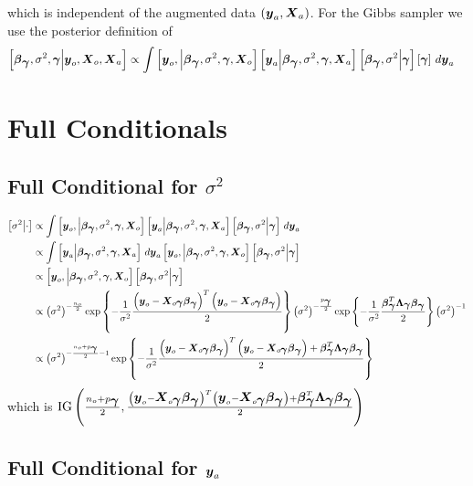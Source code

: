 \documentclass{article}
\def\bm#1{\mbox{\boldmath $#1$}}
\begin{document}
%
which is independent of the augmented data $\left( \bm{y}_a, \bm{X}_a \right)$. For the Gibbs sampler we use the posterior definition of
\begin{align*}
\left[ \bm{\beta}_{\bm{\gamma}}, \sigma^2, \bm{\gamma} \middle| \bm{y}_o, \bm{X}_o, \bm{X}_a \right] & \propto \int \left[ \bm{y}_o, \middle| \bm{\beta}_{\bm{\gamma}}, \sigma^2, \bm{\gamma}, \bm{X}_o \right] \left[ \bm{y}_a \middle| \bm{\beta}_{\bm{\gamma}}, \sigma^2, \bm{\gamma}, \bm{X}_a \right] \left[ \bm{\beta}_{\bm{\gamma}}, \sigma^2 \middle| \bm{\gamma} \right] \left[ \bm{\gamma} \right] \, d \bm{y}_a
\end{align*}
\section{Full Conditionals}
\subsection{Full Conditional for $\sigma^2$}
%
\begin{align*}
%
\left[ \sigma^2 \middle| \cdot \right] & \propto \int \left[ \bm{y}_o, \middle| \bm{\beta}_{\bm{\gamma}}, \sigma^2, \bm{\gamma}, \bm{X}_o \right] \left[ \bm{y}_a \middle| \bm{\beta}_{\bm{\gamma}}, \sigma^2, \bm{\gamma}, \bm{X}_a \right] \left[ \bm{\beta}_{\bm{\gamma}}, \sigma^2 \middle| \bm{\gamma} \right] \, d \bm{y}_a\\
%
 & \propto \int \left[ \bm{y}_a \middle| \bm{\beta}_{\bm{\gamma}}, \sigma^2, \bm{\gamma}, \bm{X}_a \right] \, d \bm{y}_a \left[ \bm{y}_o, \middle| \bm{\beta}_{\bm{\gamma}}, \sigma^2, \bm{\gamma}, \bm{X}_o \right] \left[ \bm{\beta}_{\bm{\gamma}}, \sigma^2 \middle| \bm{\gamma} \right] \\
%
 & \propto \left[ \bm{y}_o, \middle| \bm{\beta}_{\bm{\gamma}}, \sigma^2, \bm{\gamma}, \bm{X}_o \right] \left[ \bm{\beta}_{\bm{\gamma}}, \sigma^2 \middle| \bm{\gamma} \right] \\
%
 & \propto \left( \sigma^2 \right)^{ - \frac{n_o} {2}} \exp{\left\{ - \frac{1} {\sigma^2} \frac{ \left( \bm{y}_o - \bm{X}_{o \bm{\gamma}} \bm{\beta}_{\bm{\gamma}} \right)^T \left( \bm{y}_o - \bm{X}_{o \bm{\gamma}} \bm{\beta}_{\bm{\gamma}} \right) } {2} \right\} } \left( \sigma^2 \right)^{ - \frac{p_{\bm{\gamma}}} {2}} \exp{ \left\{ - \frac{1} {\sigma^2} \frac{\bm{\beta}_{\bm{\gamma}}^T \bm{\Lambda}_{\bm{\gamma}} \bm{\beta}_{\bm{\gamma}}} {2} \right\} } \left( \sigma^2 \right)^{ - 1}\\
%
 & \propto \left( \sigma^2 \right)^{ - \frac{n_o + p_{\bm{\gamma}}} {2} - 1} \exp{\left\{ - \frac{1} {\sigma^2} \frac{ \left( \bm{y}_o - \bm{X}_{o \bm{\gamma}} \bm{\beta}_{\bm{\gamma}} \right)^T \left( \bm{y}_o - \bm{X}_{o \bm{\gamma}} \bm{\beta}_{\bm{\gamma}} \right) + \bm{\beta}_{\bm{\gamma}}^T \bm{\Lambda}_{\bm{\gamma}} \bm{\beta}_{\bm{\gamma}} } {2} \right\} } 
%
\end{align*}
%
which is $\mbox{IG} \left( \frac{n_o + p_{\bm{\gamma}}} {2}, \frac{\left( \bm{y}_o - \bm{X}_{o \bm{\gamma}} \bm{\beta}_{\bm{\gamma}} \right)^T \left( \bm{y}_o - \bm{X}_{o \bm{\gamma}} \bm{\beta}_{\bm{\gamma}} \right) + \bm{\beta}_{\bm{\gamma}}^T \bm{\Lambda}_{\bm{\gamma}} \bm{\beta}_{\bm{\gamma}}} {2} \right)$
\subsection{Full Conditional for $\bm{y}_a$}
%
\end{document}

